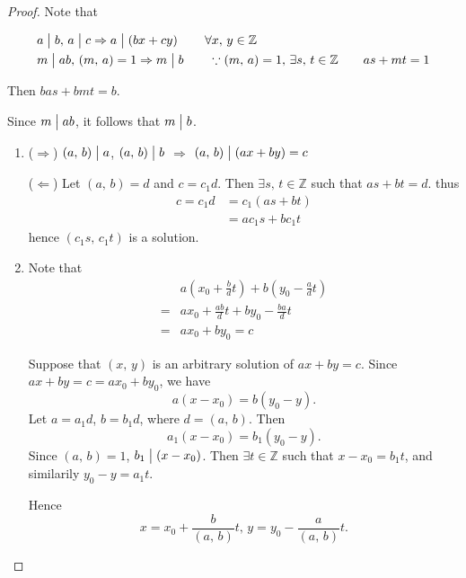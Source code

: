 
\begin{proof}
    Note that

    \begin{align*}
        & a \bigm| b,\, a \bigm| c \Rightarrow a \bigm| \left(bx+cy\right) \qquad\forall x,\,y\in\mathbb{Z} \\
        & m \bigm| ab,\, \left(m,\,a\right)=1 \Rightarrow m\bigm| b \qquad \because \left(m,\,a\right)=1,\, \exists s,\,t \in \mathbb{Z} \qquad as+mt=1
    \end{align*}

    Then $bas+bmt=b$.

    Since $m\bigm| ab$, it follows that $m \bigm| b$.

    \begin{enumerate}
        \item ($\Rightarrow$)
        $\left(a,\,b\right)\bigm| a$, $\left(a,\,b\right)\bigm| b$ $\Rightarrow$
        $\left(a,\,b\right)\bigm| \left(ax+by\right)=c$

        ($\Leftarrow$)
        Let $\left(a,\,b\right)=d$ and $c=c_1d$. Then $\exists s,\,t \in \mathbb{Z}$ such that $as+bt = d$.
        thus
        \begin{align*}
            c=c_1d &= c_1\left(as+bt\right) \\
            &=ac_1s + bc_1t
        \end{align*}
        hence $\left(c_1s,\,c_1t\right)$ is a solution.

        \item Note that
        \begin{align*}
            &a\left(x_0+\frac{b}{d}t\right) + b\left(y_0-\frac{a}{d}t\right)\\
            =&ax_0+\frac{ab}{d}t+by_0-\frac{ba}{d}t \\
            =& ax_0+by_0=c
        \end{align*}
        
        Suppose that $\left(x,\,y\right)$ is an arbitrary solution of $ax+by=c$.
        Since $ax+by=c=ax_0+by_0$, we have
        \[
            a\left(x-x_0\right)=b\left(y_0-y\right).
        \]
        Let $a=a_1d$, $b=b_1d$, where $d=\left(a,\,b\right)$. Then
        \[
            a_1\left(x-x_0\right)=b_1\left(y_0-y\right).
        \]
        Since $\left(a,\,b\right)=1$, $b_1\bigm| \left(x-x_0\right)$. Then
        $\exists t \in \mathbb{Z}$ such that $x-x_0=b_1t$, and similarily $y_0-y=a_1t$.

        Hence \[
            x=x_0+\frac{b}{\left(a,\,b\right)}t,\, y=y_0-\frac{a}{\left(a,\,b\right)}t
        .\]
    \end{enumerate}
\end{proof}

